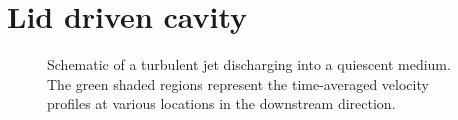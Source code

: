 \clearpage
\section{Lid driven cavity}
%
\begin{figure}[hbt!]
    \centering
    
    \caption{Schematic of a turbulent jet discharging into a quiescent medium. The green shaded regions represent the time-averaged velocity profiles at various locations in the downstream direction.}
\end{figure}%
